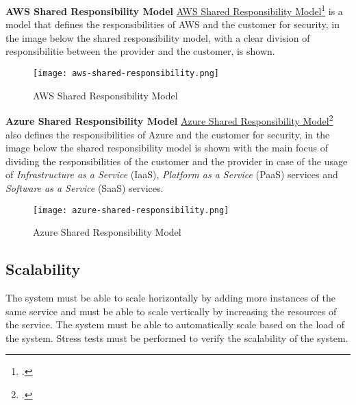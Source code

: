    \newpage
    \textbf{AWS Shared Responsibility Model}
    \href{https://aws.amazon.com/it/compliance/shared-responsibility-model/}{AWS Shared Responsibility Model}\footcite{site:aws-shared-responsibility-model} is a model that defines the responsibilities of AWS and the customer for security, in the image below the shared responsibility model, with a clear division of responsibilitie between the provider and the customer, is shown.\\
    \begin{figure}[htbp]
        \centering
        \texttt{[image: aws-shared-responsibility.png]}
        \caption{AWS Shared Responsibility Model}
    \end{figure}

    \newpage
    \textbf{Azure Shared Responsibility Model}
    \href{https://learn.microsoft.com/en-us/azure/security/fundamentals/shared-responsibility}{Azure Shared Responsibility Model}\footcite{site:azure-shared-responsibility-model} also defines the responsibilities of Azure and the customer for security, in the image below the shared responsibility model is shown with the main focus of dividing the responsibilities of the customer and the provider in case of the usage of \textit{Infrastructure as a Service} (IaaS), \textit{Platform as a Service} (PaaS) services and \textit{Software as a Service} (SaaS) services.\\
    
    \begin{figure}[htbp]
        \centering
        \texttt{[image: azure-shared-responsibility.png]}
        \caption{Azure Shared Responsibility Model}
    \end{figure}

\subsection{Scalability}
The system must be able to scale horizontally by adding more instances of the same service and must be able to scale vertically by increasing the resources of the service. The system must be able to automatically scale based on the load of the system.
Stress tests must be performed to verify the scalability of the system.\\

